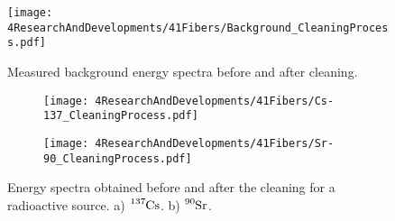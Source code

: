 \begin{figure}[h]
\centering
\texttt{[image: 4ResearchAndDevelopments/41Fibers/Background\_CleaningProcess.pdf]}
\caption{Measured background energy spectra before and after cleaning.\label{fig:ResultsOfCleaningProcessBackground}}
\end{figure}

\begin{figure}
\centering
    \begin{subfigure}[b]{1\textwidth}
    \centering
    \texttt{[image: 4ResearchAndDevelopments/41Fibers/Cs-137\_CleaningProcess.pdf]}  
    \caption{\label{subfig:EnergySpectrumCo60CleaningTest}}
    \end{subfigure}
    \hfill
    \begin{subfigure}[b]{1\textwidth}
    \centering
    \texttt{[image: 4ResearchAndDevelopments/41Fibers/Sr-90\_CleaningProcess.pdf]}  
    \caption{\label{subfig:EnergySpectrumSr90CleaningTest}}
    \end{subfigure}
 \caption{Energy spectra obtained before and after the cleaning for a radioactive source. a) $\ce{^{137}Cs}$. b) $\ce{^{90}Sr}$.}
 \label{fig:ResultsOfCleaningProcessSource}
\end{figure}


